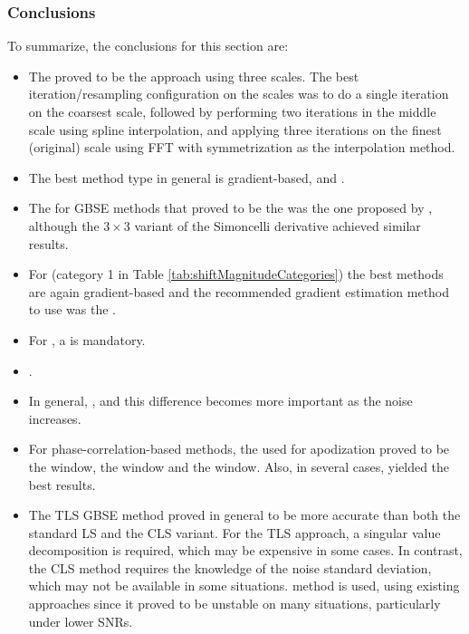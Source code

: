 \subsubsection{Conclusions}
\label{sec:summaryShiftEstimationUnderNoise}
To summarize, the conclusions for this section are:
\begin{itemize}
\setlength\itemsep{-0.5em}
\item The  proved to be the  approach using three scales. The best iteration/resampling configuration on the scales was to do a single iteration on the coarsest scale, followed by performing two iterations in the middle scale using spline interpolation, and applying three iterations on the finest (original) scale using FFT with symmetrization as the interpolation method. 
\item The best method type in general is gradient-based, and .
\item The  for GBSE methods that proved to be the  was the one proposed by , although the $3 \times 3$ variant of the Simoncelli derivative \cite{Simoncelli_1994} achieved similar results.
\item For  (category 1 in Table \ref{tab:shiftMagnitudeCategories}) the best methods are again gradient-based and the recommended gradient estimation method to use was the .
\item For , a  is mandatory.
\item {}.
\item In general, , and this difference becomes more important as the noise increases.
\item For phase-correlation-based methods, the  used for apodization proved to be the  window, the  window and the  window. Also, in several cases,  yielded the best results.
\item The TLS GBSE method proved in general to be more accurate than both the standard LS and the CLS variant. For the TLS approach, a singular value decomposition is required, which may be expensive in some cases. In contrast, the CLS method requires the knowledge of the noise standard deviation, which may not be available in some situations.  method is used,  using existing approaches \cite{Weber95robustcomputation, Tsai1998}  since it proved to be unstable on many situations, particularly under lower SNRs.

\end{itemize}
